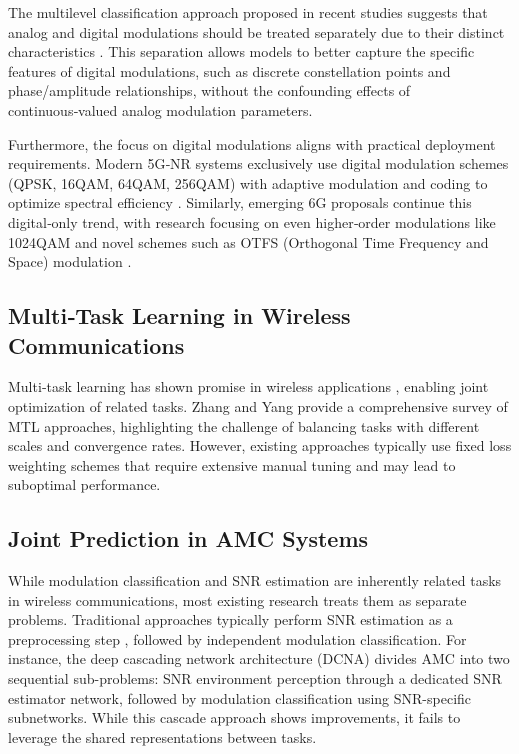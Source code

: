 \documentclass{ELSP}
\begin{document}
The multilevel classification approach proposed in recent studies suggests that analog and digital modulations should be treated separately due to their distinct characteristics \cite{zheng2023toward}. This separation allows models to better capture the specific features of digital modulations, such as discrete constellation points and phase/amplitude relationships, without the confounding effects of continuous‑valued analog modulation parameters.

Furthermore, the focus on digital modulations aligns with practical deployment requirements. Modern 5G‑NR systems exclusively use digital modulation schemes (QPSK, 16QAM, 64QAM, 256QAM) with adaptive modulation and coding to optimize spectral efficiency \cite{kong2023transformer}. Similarly, emerging 6G proposals continue this digital‑only trend, with research focusing on even higher‑order modulations like 1024QAM and novel schemes such as OTFS (Orthogonal Time Frequency and Space) modulation \cite{sun2023novel}.

\subsection{Multi‑Task Learning in Wireless Communications}
Multi‑task learning has shown promise in wireless applications \cite{jagannath2022multi}, enabling joint optimization of related tasks. Zhang and Yang \cite{zhang2021survey} provide a comprehensive survey of MTL approaches, highlighting the challenge of balancing tasks with different scales and convergence rates. However, existing approaches typically use fixed loss weighting schemes that require extensive manual tuning and may lead to suboptimal performance.

\subsection{Joint Prediction in AMC Systems}
While modulation classification and SNR estimation are inherently related tasks in wireless communications, most existing research treats them as separate problems. Traditional approaches typically perform SNR estimation as a preprocessing step \cite{amscn2023}, followed by independent modulation classification. For instance, the deep cascading network architecture (DCNA) \cite{deepcascading2021} divides AMC into two sequential sub-problems: SNR environment perception through a dedicated SNR estimator network, followed by modulation classification using SNR-specific subnetworks. While this cascade approach shows improvements, it fails to leverage the shared representations between tasks.
\end{document}
